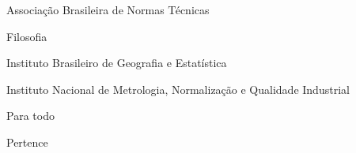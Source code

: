 \documentclass[
        oneside,      %
        english,			
        brazil			 
        ]{abntbibufjf}
\begin{document}

\ilustvaria   %
\listilustvaria  %


\cleardoublepage
{}



\listoftables*    %

\cleardoublepage



\begin{siglas} %
  \item[ABNT] Associa\c{c}\~ao Brasileira de Normas T\'ecnicas
  \item[Fil.] Filosofia 
  \item[IBGE] Instituto Brasileiro de Geografia e Estat\'istica 
  \item[INMETRO] Instituto Nacional de Metrologia, Normaliza\c{c}\~ao e Qualidade Industrial
  \end{siglas}


\begin{simbolos} %
  \item[$ \forall $] Para todo
  \item[$ \in $] Pertence
 \end{simbolos}

 

\tableofcontents*
\cleardoublepage
\end{document}
